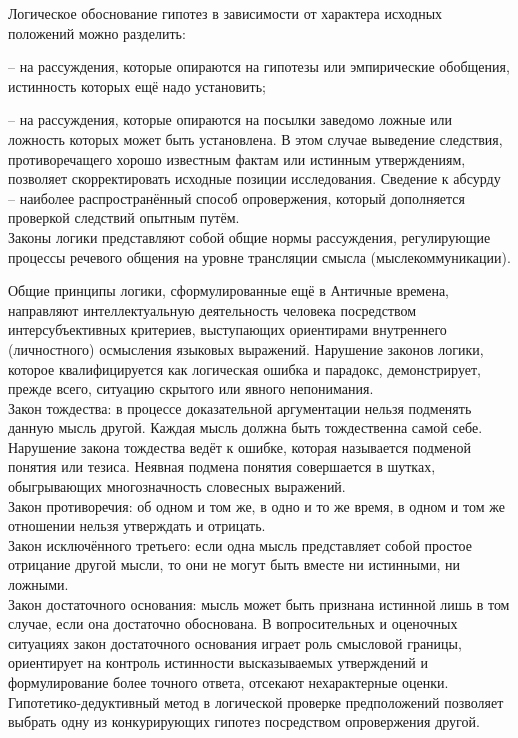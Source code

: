 \documentclass[exam_answers.tex]{subfiles}
\begin{document}
\renewcommand{\baselinestretch}{\blch}

Логическое обоснование гипотез в зависимости от характера исходных положений можно разделить:

-- на рассуждения, которые опираются на гипотезы или эмпирические обобщения, истинность которых ещё надо установить;

-- на рассуждения, которые опираются на посылки заведомо ложные или ложность которых может быть установлена.
В этом случае выведение следствия, противоречащего хорошо известным фактам или истинным утверждениям, позволяет скорректировать исходные позиции исследования.
Сведение к абсурду – наиболее распространённый способ опровержения, который дополняется проверкой следствий опытным путём.
\\

Законы логики представляют собой общие нормы рассуждения, регулирующие процессы речевого общения на уровне трансляции смысла (мыслекоммуникации).

Общие принципы логики, сформулированные ещё в Античные времена, направляют интеллектуальную деятельность человека посредством интерсубъективных критериев, выступающих ориентирами внутреннего (личностного) осмысления языковых выражений.
Нарушение законов логики, которое квалифицируется как логическая ошибка и парадокс, демонстрирует, прежде всего, ситуацию скрытого или явного непонимания.
\\

Закон тождества: в процессе доказательной аргументации нельзя подменять данную мысль другой.
Каждая мысль должна быть тождественна самой себе.
Нарушение закона тождества ведёт к ошибке, которая называется подменой понятия или тезиса.
Неявная подмена понятия совершается в шутках, обыгрывающих многозначность словесных выражений.
\\

Закон противоречия: об одном и том же, в одно и то же время, в одном и том же отношении нельзя утверждать и отрицать.
\\

Закон исключённого третьего: если одна мысль представляет собой простое отрицание другой мысли, то они не могут быть вместе ни истинными, ни ложными.
\\

Закон достаточного основания: мысль может быть признана истинной лишь в том случае, если она достаточно обоснована.
В вопросительных и оценочных ситуациях закон достаточного основания играет роль смысловой границы, ориентирует на контроль истинности высказываемых утверждений и формулирование более точного ответа, отсекают нехарактерные оценки.
\\

Гипотетико-дедуктивный метод в логической проверке предположений позволяет выбрать одну из конкурирующих гипотез посредством опровержения другой.
\end{document}
